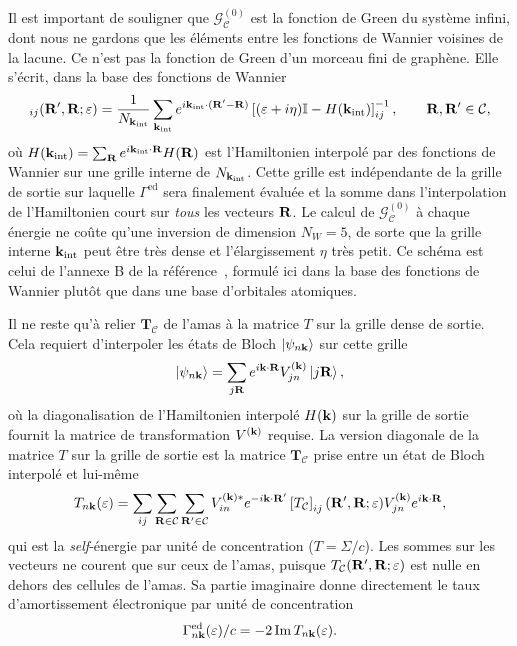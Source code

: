 Il est important de souligner que $\bm{\mathcal{G}}^{(0)}_\mathcal{C}$ est la fonction de Green du système infini, dont nous ne gardons que les éléments entre les fonctions de Wannier voisines de la lacune. Ce n'est pas la fonction de Green d'un morceau fini de graphène. Elle s'écrit, dans la base des fonctions de Wannier
\begin{equation}
[\mathcal{G}^{(0)}_{\mathcal{C}}]_{ij}(\Rv',\Rv;\varepsilon) = \frac{1}{N_{\kv_\text{int}}}\sum_{\kv_\text{int}} e^{i\kv_\text{int}\cdot(\Rv'-\Rv)}\left[(\varepsilon+i\eta)\mathbb{I}-H(\kv_\text{int})\right]^{-1}_{ij},\qquad \Rv,\Rv'\in\mathcal{C},\label{eqn:g_loc}
\end{equation}
où $H(\mathbf{k}_\text{int})=\sum_{\mathbf{R}} e^{i\mathbf{k}_\text{int}\cdot\mathbf{R}}H(\mathbf{R})$ est l'Hamiltonien interpolé par des fonctions de Wannier sur une grille interne de $N_{\mathbf{k}_\text{int}}$. Cette grille est indépendante de la grille de sortie sur laquelle $\Gamma^\text{ed}$ sera finalement évaluée et la somme dans l'interpolation de l'Hamiltonien court sur \textit{tous} les vecteurs $\mathbf{R}$. Le calcul de $\bm{\mathcal{G}}^{(0)}_\mathcal{C}$ à chaque énergie ne coûte qu'une inversion de dimension $N_W=5$, de sorte que la grille interne $\mathbf{k}_\text{int}$ peut être très dense et l'élargissement $\eta$ très petit. Ce schéma est celui de l'annexe B de la référence~\cite{kaasbjergAtomisticMatrixTheory2020}, formulé ici dans la base des fonctions de Wannier plutôt que dans une base d'orbitales atomiques.

Il ne reste qu'à relier $\bm T_\mathcal{C}$ de l'amas à la matrice $T$ sur la grille dense de sortie. Cela requiert d'interpoler les états de Bloch $\ket{\psi_{n\mathbf{k}}}$ sur cette grille
\begin{equation}
    \ket{\psi_{n\mathbf{k}}} = \sum_{j\mathbf{R}} e^{i\mathbf{k}\cdot\mathbf{R}}V^{(\mathbf{k})}_{jn}\ket{j\mathbf{R}},\label{eqn:Bloch_Wannier}
\end{equation}
où la diagonalisation de l'Hamiltonien interpolé $H(\mathbf{k})$ sur la grille de sortie fournit la matrice de transformation $V^{(\mathbf{k})}$ requise. La version diagonale de la matrice $T$ sur la grille de sortie est la matrice $\bm T_\mathcal{C}$ prise entre un état de Bloch interpolé et lui-même
\begin{equation}
    T_{n\mathbf{k}}(\varepsilon) = \sum_{ij}\sum_{\mathbf{R}\in\mathcal{C}}\sum_{\mathbf{R}'\in\mathcal{C}}V_{in}^{(\mathbf{k})*}e^{-i\mathbf{k}\cdot\mathbf{R}'}\left[T_\mathcal{C}\right]_{ij}(\mathbf{R}',\mathbf{R}; \varepsilon)V^{(\mathbf{k})}_{jn}e^{i\mathbf{k}\cdot\mathbf{R}},\label{eqn:T_bloch}
\end{equation}
qui est la \textit{self}-énergie par unité de concentration ($T=\Sigma/c$). Les sommes sur les vecteurs ne courent que sur ceux de l'amas, puisque $T_\mathcal{C}(\mathbf{R}',\mathbf{R};\varepsilon)$ est nulle en dehors des cellules de l'amas. Sa partie imaginaire donne directement le taux d'amortissement électronique par unité de concentration
\begin{equation}
    \Gamma_{n\mathbf{k}}^\text{ed}(\varepsilon)/c = -2\,\mathrm{Im}\,T_{n\mathbf{k}}(\varepsilon).\label{eqn:gamma_loc}
\end{equation}

